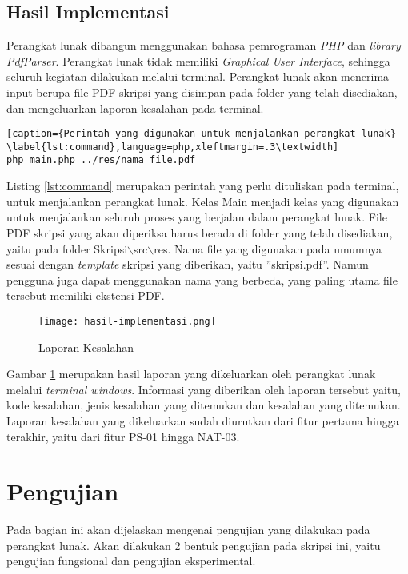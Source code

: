 \subsection{Hasil Implementasi}
Perangkat lunak dibangun menggunakan bahasa pemrograman \textit{PHP} dan \textit{library PdfParser}. Perangkat lunak tidak memiliki \textit{Graphical User Interface}, sehingga seluruh kegiatan dilakukan melalui terminal. Perangkat lunak akan menerima input berupa file PDF skripsi yang disimpan pada folder yang telah disediakan, dan mengeluarkan laporan kesalahan pada terminal.

\begin{lstlisting}[caption={Perintah yang digunakan untuk menjalankan perangkat lunak}	\label{lst:command},language=php,xleftmargin=.3\textwidth] 
php main.php ../res/nama_file.pdf
\end{lstlisting}
\medskip

Listing \ref{lst:command} merupakan perintah yang perlu dituliskan pada terminal, untuk menjalankan perangkat lunak. Kelas Main menjadi kelas yang digunakan untuk menjalankan seluruh proses yang berjalan dalam perangkat lunak. File PDF skripsi yang akan diperiksa harus berada di folder yang telah disediakan, yaitu pada folder Skripsi$\backslash$src$\backslash$res. Nama file yang digunakan pada umumnya sesuai dengan \textit{template} skripsi yang diberikan, yaitu ''skripsi.pdf''. Namun pengguna juga dapat menggunakan nama yang berbeda, yang paling utama file tersebut memiliki ekstensi PDF.

\begin{figure}[H]
	\centering	
	\texttt{[image: hasil-implementasi.png]}
	\caption{Laporan Kesalahan}	
	\label{fig:error_report} 
\end{figure}
\medskip

Gambar \ref{fig:error_report} merupakan hasil laporan yang dikeluarkan oleh perangkat lunak melalui \textit{terminal windows}. Informasi yang diberikan oleh laporan tersebut yaitu, kode kesalahan, jenis kesalahan yang ditemukan dan kesalahan yang ditemukan. Laporan kesalahan yang dikeluarkan sudah diurutkan dari fitur pertama hingga terakhir, yaitu dari fitur PS-01 hingga NAT-03.

\section{Pengujian}
Pada bagian ini akan dijelaskan mengenai pengujian yang dilakukan pada perangkat lunak. Akan dilakukan 2 bentuk pengujian pada skripsi ini, yaitu pengujian fungsional dan pengujian eksperimental.

